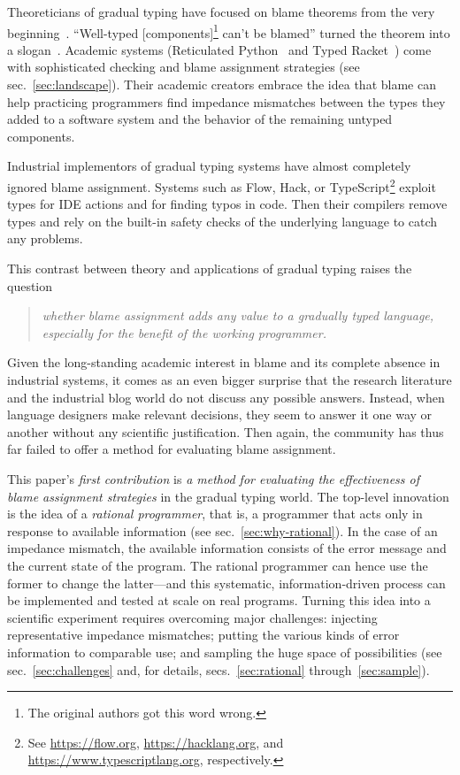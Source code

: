 
Theoreticians of gradual typing have focused on blame theorems from the very
beginning~\cite{mf-toplas-2009, tf-dls-2006}. ``Well-typed
[components]\footnote{The original authors got this word wrong.} can't be
blamed'' turned the theorem into a slogan~\cite{wf-esop-2009}. Academic systems
(Reticulated Python~\cite{vsc-dls-2019, vss-popl-2017, vksb-dls-2014} and Typed
Racket~\cite{tf-dls-2006,tf-popl-2008,tfffgksst-snapl-2017,tf-icfp-2010}) come
with sophisticated checking and blame assignment strategies (see sec.~\ref{sec:landscape}). Their academic creators embrace
the idea that blame can help practicing programmers find impedance mismatches
between the types they added to a software system and the behavior of the
remaining untyped components.

Industrial implementors of gradual typing systems have almost
completely ignored blame assignment.  Systems such as Flow, Hack, or
TypeScript\footnote{See \url{https://flow.org},
\url{https://hacklang.org}, and \url{https://www.typescriptlang.org},
respectively.} exploit types for IDE actions and for finding typos in
code. Then their compilers remove types and rely on the built-in
safety checks of the underlying language to catch any problems.

This contrast between theory and applications of gradual typing raises the question 
\begin{quote}
 \it
 whether blame assignment adds any value to a gradually typed language,
 especially for the benefit of the working programmer.
\end{quote}
Given the long-standing academic interest in blame and its complete absence in
industrial systems, it comes as an even bigger surprise that the research
literature and the industrial blog world do not discuss any possible answers.
Instead, when language designers make relevant decisions, they seem to answer it
one way or another without any scientific justification. Then again, the
community has thus far failed to offer a method for evaluating blame assignment.

This paper's {\em first contribution\/} is {\em a method for evaluating the
effectiveness of blame assignment strategies\/} in the gradual typing world.
The top-level innovation is the idea of a {\em rational programmer\/}, that is,
a programmer that acts only in response to available information (see
sec.~\ref{sec:why-rational}). In the case of an impedance mismatch, the
available information consists of the error message and the current state of the
program. The rational programmer can hence use the former to change the
latter---and this systematic, information-driven process can be implemented and
tested at scale on real programs.  Turning this idea into a scientific
experiment requires overcoming major challenges: injecting representative
impedance mismatches; putting the various kinds of error information to
comparable use; and sampling the huge space of possibilities (see
sec.~\ref{sec:challenges} and, for details, secs.~\ref{sec:rational} through~\ref{sec:sample}).


